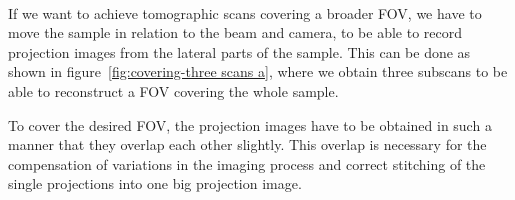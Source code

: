 \begin{figure*}[tb]
	\centering
	\subfloat[\SI{180}{\degree}]{\label{subfig:cover180}}\\
	\subfloat[\SI{360}{\degree}]{\label{subfig:cover360}}
	\caption{Covering the FOV -- one scan}
	\label{fig:covering-one scan}
\end{figure*}

\begin{figure*}[tb]
	\centering
		
	\caption{Stacked Scanning - long and thin samples}
	\label{fig:stacked-scanning}
\end{figure*}

\begin{figure*}[tb]
	\centering
		
	\caption{Stacked Scanning - broad samples}
	\label{fig:widefield-scanning}
\end{figure*}

If we want to achieve tomographic scans covering a broader FOV, we have to move the sample in relation to the beam and camera, to be able to record projection images from the lateral parts of the sample. This can be done as shown in figure~\ref{fig:covering-three scans a},  where we obtain three subscans to be able to reconstruct a FOV covering the whole sample.

\begin{figure*}[tb]
	\centering
	
	\caption{Covering the FOV -- three scans $\rightarrow$ sample has to move, explain that we still only do \SI{180}{\degree} scans!}
	\label{fig:covering-three scans a}
\end{figure*}

\begin{figure*}[tb]
	\centering
	
	\caption{Or is this better for the understanding?: Covering the FOV -- three scans $\rightarrow$ sample has to move, explain that we still only do \SI{180}{\degree} scans!}
	\label{fig:covering-three scans b}
\end{figure*}

To cover the desired FOV, the projection images have to be obtained in such a manner that they overlap each other slightly. This overlap is necessary for the compensation of variations in the imaging process and correct stitching of the single projections into one big projection image. 

